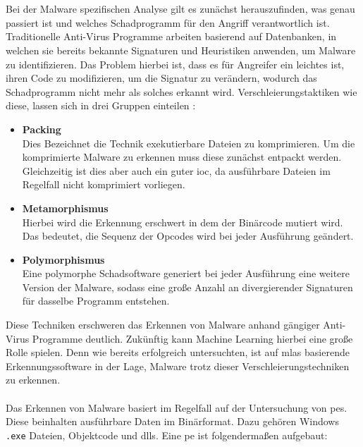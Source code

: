 \documentclass[
    12pt, %
    DIV10,
    ngerman, %
    a4paper, %
    oneside, %
    titlepage, %
    parskip=half, %
    headings=normal, %
    listof=totoc, %
    bibliography=totoc, %
    index=totoc, %
    captions=tableheading, %
    final %
]{scrreprt}
\begin{document}
\\\\
Bei der Malware spezifischen Analyse gilt es zunächst herauszufinden, was genau passiert ist und welches Schadprogramm für den Angriff verantwortlich ist. Traditionelle Anti-Virus Programme arbeiten basierend auf Datenbanken, in welchen sie bereits bekannte Signaturen und Heuristiken anwenden, um Malware zu identifizieren. Das Problem hierbei ist, dass es für Angreifer ein leichtes ist, ihren Code zu modifizieren, um die Signatur zu verändern, wodurch das Schadprogramm nicht mehr als solches erkannt wird. Verschleierungstaktiken wie diese, lassen sich in drei Gruppen einteilen \parencite{he2017model}:
\begin{itemize}
\item \textbf{Packing}\\ Dies Bezeichnet die Technik exekutierbare Dateien zu komprimieren. Um die komprimierte Malware zu erkennen muss diese zunächst entpackt werden. Gleichzeitig ist dies aber auch ein guter \ac{ioc}, da ausführbare Dateien im Regelfall nicht komprimiert vorliegen.
\item \textbf{Metamorphismus}\\ Hierbei wird die Erkennung erschwert in dem der Binärcode mutiert wird. Das bedeutet, die Sequenz der Opcodes wird bei jeder Ausführung geändert.
\item \textbf{Polymorphismus}\\ Eine polymorphe Schadsoftware generiert bei jeder Ausführung eine weitere Version der Malware, sodass eine gro{\ss}e Anzahl an divergierender Signaturen für dasselbe Programm entstehen.
\end{itemize}
Diese Techniken erschweren das Erkennen von Malware anhand gängiger Anti-Virus Programme deutlich. Zukünftig kann Machine Learning hierbei eine gro{\ss}e Rolle spielen. Denn wie \textcite{Han2019} bereits erfolgreich untersuchten, ist auf \ac{mlas} basierende Erkennungssoftware in der Lage, Malware trotz dieser Verschleierungstechniken zu erkennen.
\\\\
Das Erkennen von Malware basiert im Regelfall auf der Untersuchung von \ac{pes}. Diese beinhalten ausführbare Daten im Binärformat. Dazu gehören Windows \texttt{.exe} Dateien, Objektcode und \ac{dlls}. Eine \acs{pe} ist folgenderma{\ss}en aufgebaut:
\end{document}
